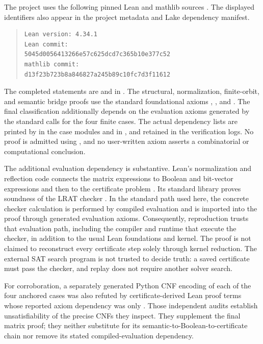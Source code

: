 \documentclass[11pt]{article}
\theoremstyle{definition}
\theoremstyle{remark}
\begin{document}
The project uses the following pinned Lean and mathlib sources
\cite{lean-source,mathlib-source}. The displayed identifiers also appear
in the project metadata and Lake dependency manifest.
\begin{quote}
\small
\begin{verbatim}
Lean version: 4.34.1
Lean commit:
5045d0056413266e57c625dcd7c365b10e377c52
mathlib commit:
d13f23b723b8a846827a245b89c10fc7d3f11612
\end{verbatim}
\end{quote}

The completed statements are
 and
 in .
The structural, normalization, finite-orbit, and semantic bridge proofs
use the standard foundational axioms ,
, and . The final classification
additionally depends on the evaluation axioms generated by the standard
 calls for the four finite cases. The actual dependency
lists are printed by  in the case modules and in
, and retained in the verification logs.
No proof is admitted using , and no user-written axiom
asserts a combinatorial or computational conclusion.

The additional evaluation dependency is substantive. Lean's
normalization and reflection code connects the matrix expressions to
Boolean and bit-vector expressions and then to the certificate problem
\cite{lean-source}. Its standard library proves soundness of the LRAT
checker \cite{lrat-source}. In the standard  path used
here, the concrete checker calculation is performed by compiled
evaluation and is imported into the proof through generated evaluation
axioms. Consequently, reproduction trusts that evaluation path,
including the compiler and runtime that execute the checker, in
addition to the usual Lean foundations and kernel. The proof is not
claimed to reconstruct every certificate step solely through kernel
reduction. The external SAT search program is not trusted to decide
truth: a saved certificate must pass the checker, and replay does not
require another solver search.

For corroboration, a separately generated Python CNF encoding of each
of the four anchored cases was also refuted by certificate-derived
Lean proof terms whose reported axiom dependency was only
. Those independent audits establish unsatisfiability of
the precise CNFs they inspect. They supplement the final matrix proof;
they neither substitute for its semantic-to-Boolean-to-certificate
chain nor remove its stated compiled-evaluation dependency.
\end{document}
